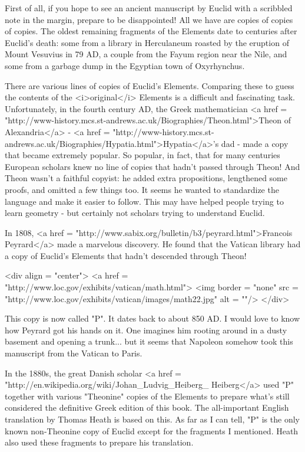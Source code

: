 First of all, if you hope to see an ancient manuscript by Euclid with 
a scribbled note in the margin, prepare to be disappointed!  All we 
have are copies of copies of copies.  The oldest remaining fragments 
of the Elements date to centuries after Euclid's death: some from a 
library in Herculaneum roasted by the eruption of Mount Vesuvius in 79 
AD, a couple from the Fayum region near the Nile, and some from a 
garbage dump in the Egyptian town of Oxyrhynchus.  

There are various lines of copies of Euclid's Elements.  Comparing
these to guess the contents of the <i>original</i> Elements is a
difficult and fascinating task.  Unfortunately, in the fourth century
AD, the Greek mathematician <a href =
"http://www-history.mcs.st-andrews.ac.uk/Biographies/Theon.html">Theon
of Alexandria</a> - <a href = "http://www-history.mcs.st-andrews.ac.uk/Biographies/Hypatia.html">Hypatia</a>'s dad - made a copy that became extremely
popular.  So popular, in fact, that for many centuries European
scholars knew no line of copies that hadn't passed through Theon!  And
Theon wasn't a faithful copyist: he added extra propositions,
lengthened some proofs, and omitted a few things too.  It seems he
wanted to standardize the language and make it easier to follow.  This
may have helped people trying to learn geometry - but certainly not
scholars trying to understand Euclid.

In 1808, <a href =
"http://www.sabix.org/bulletin/b3/peyrard.html">Francois Peyrard</a> made
a marvelous discovery.  He found that the Vatican library had a copy
of Euclid's Elements that hadn't descended through Theon!  

<div align = "center">
<a href = "http://www.loc.gov/exhibits/vatican/math.html">
<img border = "none" src = "http://www.loc.gov/exhibits/vatican/images/math22.jpg" alt = ""/>
</div>

This copy
is now called "P".  It dates back to about 850 AD.  I would
love to know how Peyrard got his hands on it.  One imagines him
rooting around in a dusty basement and opening a trunk... but it seems
that Napoleon somehow took this manuscript from the Vatican to Paris.

In the 1880s, the great Danish scholar <a href =
"http://en.wikipedia.org/wiki/Johan_Ludvig_Heiberg_%
Heiberg</a> used "P" together with various
"Theonine" copies of the Elements to prepare what's still
considered the definitive Greek edition of this book.  The
all-important English translation by Thomas Heath is based on this.
As far as I can tell, "P" is the only known non-Theonine
copy of Euclid except for the fragments I mentioned.  Heath also used
these fragments to prepare his translation.


